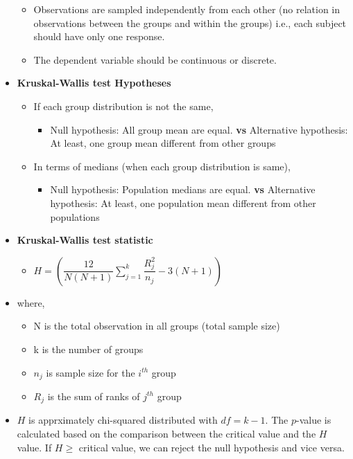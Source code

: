 \documentclass[a4paper]{article}
\begin{document}
\begin{itemize}
\begin{itemize}
        \item[] Observations are sampled independently from each other (no relation in observations between the groups and within the groups) i.e., each subject should have only one response.
        
        \item[] The dependent variable should be continuous or discrete.
    \end{itemize}
    
    \item[] \textbf{Kruskal-Wallis test Hypotheses}
    \begin{itemize}
        \item[] If each group distribution is not the same,
        \begin{itemize}
            \item[] Null hypothesis: All group mean are equal. \textbf{vs} Alternative hypothesis: At least, one group mean different from other groups
        \end{itemize}
        \item[] In terms of medians (when each group distribution is same),
        \begin{itemize}
            \item[] Null hypothesis: Population medians are equal. \textbf{vs} Alternative hypothesis: At least, one population mean different from other populations
        \end{itemize}
    \end{itemize}
    
    \item[] \textbf{Kruskal-Wallis test statistic}
    \begin{itemize}
        \centering
        \large
        \item[] $H = \left(\dfrac{12}{N(N+1)}\sum_{j=1}^{k} \dfrac{R_j^2}{n_j}-3(N+1)\right)$
    \end{itemize}
    
    \item[] where,
    \begin{itemize}
        \item[] N is the total observation in all groups (total sample size)
        \item[] k is the number of groups
        \item[] $n_j$ is sample size for the $i^{th}$ group
        \item[] $R_j$ is the sum of ranks of $j^{th}$ group 
    \end{itemize}
    
    \item[] $H$ is apprximately chi-squared distributed with $df=k-1$. The $p$-value is calculated based on the comparison between the critical value and the $H$ value. If $H\geqslant$ critical value, we can reject the null hypothesis and vice versa.
\end{itemize}
\end{document}
